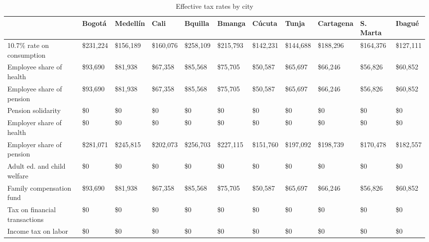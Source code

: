 \documentclass[12pt]{article}
\begin{document}
\begin{landscape}
\begin{table}[]
\caption{Effective tax rates by city}
\label{table:tcity}
\footnotesize
\begin{tabular}{lllllllllll} \hline
& Bogot\'{a}                            & Medell\'{i}n    & Cali        & Bquilla & Bmanga & C\'{u}cuta      & Tunja       & Cartagena   & S. Marta & Ibagu\'{e}                 \\ \hline
10.7\% rate on consumption        & \$231,224   & \$156,189   & \$160,076    & \$258,109   & \$215,793   & \$142,231   & \$144,688   & \$188,296   & \$164,376   & \$127,111   \\
Employee share of health          & \$93,690    & \$81,938    & \$67,358     & \$85,568    & \$75,705    & \$50,587    & \$65,697    & \$66,246    & \$56,826    & \$60,852    \\
Employee share of pension         & \$93,690    & \$81,938    & \$67,358     & \$85,568    & \$75,705    & \$50,587    & \$65,697    & \$66,246    & \$56,826    & \$60,852    \\
Pension solidarity                & \$0         & \$0         & \$0          & \$0         & \$0         & \$0         & \$0         & \$0         & \$0         & \$0         \\
Employer share of health          & \$0         & \$0         & \$0          & \$0         & \$0         & \$0         & \$0         & \$0         & \$0         & \$0         \\
Employer share of pension         & \$281,071   & \$245,815   & \$202,073    & \$256,703   & \$227,115   & \$151,760   & \$197,092   & \$198,739   & \$170,478   & \$182,557   \\
Adult ed. and child welfare & \$0         & \$0         & \$0          & \$0         & \$0         & \$0         & \$0         & \$0         & \$0         & \$0         \\
Family compensation fund          & \$93,690    & \$81,938    & \$67,358     & \$85,568    & \$75,705    & \$50,587    & \$65,697    & \$66,246    & \$56,826    & \$60,852    \\
Tax on financial transactions     & \$0         & \$0         & \$0          & \$0         & \$0         & \$0         & \$0         & \$0         & \$0         & \$0         \\
Income tax on labor               & \$0         & \$0         & \$0          & \$0         & \$0         & \$0         & \$0         & \$0         & \$0         & \$0         \\

\end{tabular}
\end{table}
\end{landscape}
\end{document}
